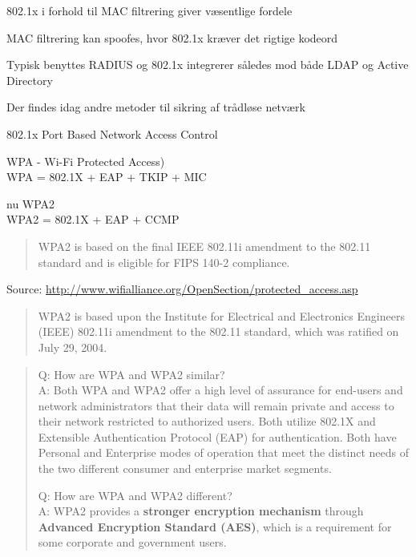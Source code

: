 \documentclass[Screen16to9,17pt]{foils}
\begin{document}

\begin{list1}
\item 802.1x i forhold til MAC filtrering giver væsentlige fordele
\item MAC filtrering kan spoofes, hvor 802.1x kræver det rigtige kodeord
\item Typisk benyttes RADIUS og 802.1x integrerer således mod både LDAP og Active Directory
\end{list1}




\begin{list1}
\item Der findes idag andre metoder til sikring af trådløse netværk
\item 802.1x Port Based Network Access Control
\item WPA - Wi-Fi Protected Access)\\
WPA = 802.1X + EAP + TKIP + MIC
\item nu WPA2\\
WPA2 = 802.1X + EAP + CCMP

\begin{quote}
WPA2 is based on the final IEEE 802.11i amendment to the 802.11
standard and is eligible for FIPS 140-2 compliance.
\end{quote}
\item Source:
\href{http://www.wifialliance.org/OpenSection/protected_access.asp}
{http://www.wifialliance.org/OpenSection/protected\_access.asp}
\end{list1}



\begin{quote}
WPA2 is based upon the Institute for Electrical and Electronics
Engineers (IEEE) 802.11i amendment to the 802.11 standard, which was
ratified on July 29, 2004.
\end{quote}

\begin{quote}
Q: How are WPA and WPA2 similar?\\
A: Both WPA and WPA2 offer a high level of assurance for end-users and network
administrators that their data will remain private and access to their
network restricted to authorized users.
Both utilize 802.1X and Extensible Authentication Protocol (EAP) for
authentication. Both have Personal and Enterprise modes of operation
that meet the distinct needs of the two different consumer and
enterprise market segments.

Q: How are WPA and WPA2 different?\\
A: WPA2 provides a {\bf stronger encryption mechanism} through {\bf
  Advanced Encryption Standard (AES)}, which is a requirement for some
corporate and government users.
\end{quote}
\end{document}
